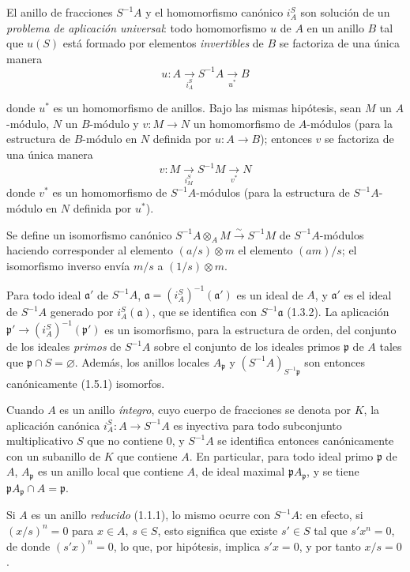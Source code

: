 \begin{env}[1.2.4]
\label{0.1.2.4-fr}
El anillo de fracciones $S^{-1}A$ y el homomorfismo canónico $i_A^S$ son solución de un \emph{problema de aplicación universal}: todo homomorfismo $u$ de $A$ en un anillo $B$ tal que $u(S)$ está formado por elementos \emph{invertibles} de $B$ se factoriza de una única manera
\[
  u:A\xrightarrow[i_A^S]{}S^{-1}A\xrightarrow[u^*]{}B
\]

donde $u^*$ es un homomorfismo de anillos.
Bajo las mismas hipótesis, sean $M$ un $A$-módulo, $N$ un $B$-módulo y $v:M\to N$ un homomorfismo de $A$-módulos (para la estructura de $B$-módulo en $N$ definida por $u:A\to B$); entonces $v$ se factoriza de una única manera
\[
  v:M\xrightarrow[i_M^S]{}S^{-1}M\xrightarrow[v^*]{}N
\]
donde $v^*$ es un homomorfismo de $S^{-1}A$-módulos (para la estructura de $S^{-1}A$-módulo en $N$ definida por $u^*$).
\end{env}

\begin{env}[1.2.5]
\label{0.1.2.5-fr}
Se define un isomorfismo canónico $S^{-1}A\otimes_A M\xrightarrow{\sim}S^{-1}M$ de $S^{-1}A$-módulos haciendo corresponder al elemento $(a/s)\otimes m$ el elemento $(am)/s$; el isomorfismo inverso envía $m/s$ a $(1/s)\otimes m$.
\end{env}

\begin{env}[1.2.6]
\label{0.1.2.6-fr}
Para todo ideal $\mathfrak{a}'$ de $S^{-1}A$, $\mathfrak{a}=(i_A^S)^{-1}(\mathfrak{a}')$ es un ideal de $A$, y $\mathfrak{a}'$ es el ideal de $S^{-1}A$ generado por $i_A^S(\mathfrak{a})$, que se identifica con $S^{-1}\mathfrak{a}$ (1.3.2).
La aplicación $\mathfrak{p}'\to(i_A^S)^{-1}(\mathfrak{p}')$ es un isomorfismo, para la estructura de orden, del conjunto de los ideales \emph{primos} de $S^{-1}A$ sobre el conjunto de los ideales primos $\mathfrak{p}$ de $A$ tales que $\mathfrak{p}\cap S=\varnothing$.
Además, los anillos locales $A_{\mathfrak{p}}$ y $(S^{-1}A)_{S^{-1}\mathfrak{p}}$ son entonces canónicamente (1.5.1) isomorfos.
\end{env}

\begin{env}[1.2.7]
\label{0.1.2.7-fr}
Cuando $A$ es un anillo \emph{íntegro}, cuyo cuerpo de fracciones se denota por $K$, la aplicación canónica $i_A^S:A\to S^{-1}A$ es inyectiva para todo subconjunto multiplicativo $S$ que no contiene $0$, y $S^{-1}A$ se identifica entonces canónicamente con un subanillo de $K$ que contiene $A$.
En particular, para todo ideal primo $\mathfrak{p}$ de $A$, $A_{\mathfrak{p}}$ es un anillo local que contiene $A$, de ideal maximal $\mathfrak{p}A_{\mathfrak{p}}$, y se tiene $\mathfrak{p}A_{\mathfrak{p}}\cap A=\mathfrak{p}$.
\end{env}

\begin{env}[1.2.8]
\label{0.1.2.8-fr}
Si $A$ es un anillo \emph{reducido} (1.1.1), lo mismo ocurre con $S^{-1}A$: en efecto, si $(x/s)^n=0$ para $x\in A$, $s\in S$, esto significa que existe $s'\in S$ tal que $s'x^n=0$, de donde $(s'x)^n=0$, lo que, por hipótesis, implica $s'x=0$, y por tanto $x/s=0$.
\end{env}
